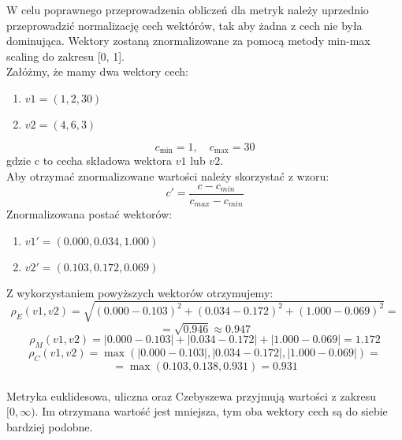 \documentclass{article}
\begin{document}
W celu poprawnego przeprowadzenia obliczeń dla metryk należy uprzednio przeprowadzić normalizację cech wektórów, tak aby żadna z cech nie była dominująca. Wektory zostaną znormalizowane za pomocą metody min-max scaling do zakresu [0, 1].\\
Załóżmy, że mamy dwa wektory cech:
\begin{enumerate}
    \item \(v1 = (1, 2, 30)\)
    \item \(v2 = (4, 6, 3)\)
\end{enumerate}
\[
    c_{\min} = 1, \quad c_{\max} = 30
\]
gdzie c to cecha składowa wektora \(v1\) lub \(v2\). \\
Aby otrzymać znormalizowane wartości należy skorzystać z wzoru:
\begin{equation}
    c' = \frac{c - c_{min}}{c_{max} - c_{min}}
\end{equation}
Znormalizowana postać wektorów:
\begin{enumerate}
    \item \(v1' = (0.000, 0.034, 1.000)\)
    \item \(v2' = (0.103, 0.172, 0.069)\)
\end{enumerate} 
Z wykorzystaniem powyższych wektorów otrzymujemy:
\[
     \rho_E(v1, v2) = \sqrt{(0.000 - 0.103)^2 + (0.034 - 0.172)^2 + (1.000 - 0.069)^2} = 
\]
\[
       = \sqrt{0.946} \approx 0.947
\]
\[
    \rho_M(v1, v2) = |0.000 - 0.103| + |0.034 - 0.172| + |1.000 - 0.069| = 1.172
\]
\[
    \rho_C(v1, v2) = \max(|0.000 - 0.103|, |0.034 - 0.172|, |1.000 - 0.069|) = 
\]
\[
     = \max(0.103, 0.138, 0.931) = 0.931
\]
\\
Metryka euklidesowa, uliczna oraz Czebyszewa przyjmują wartości z zakresu \([0, \infty)\). Im otrzymana wartość jest mniejsza, tym oba wektory cech są do siebie bardziej podobne.
\end{document}
